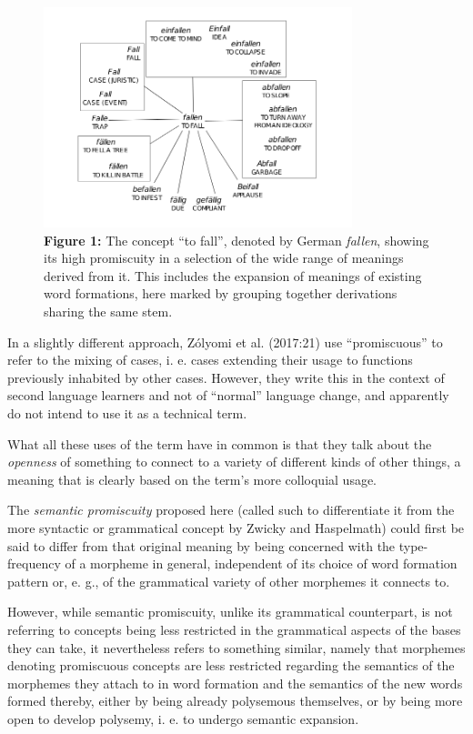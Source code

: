 \documentclass[
  a4paper,
  14pt,
  oneside,
  tablecaptionabove
]{scrbook}
\begin{document}
\begin{figure}[htb]
\centering
\includegraphics[width=0.8\textwidth]{images/fallen.png}
\captionsetup{justification=centering}
\caption*{\small \textbf{Figure 1:} The concept \enquote{to fall}, denoted by German
\emph{fallen}, showing its high promiscuity in a selection of the wide
range of meanings derived from it. This includes the expansion of
meanings of existing word formations, here marked by grouping together
derivations sharing the same stem. }
\end{figure}


In a slightly different approach, Zólyomi et al. (2017:21) use
\enquote{promiscuous} to refer to the mixing of cases, i. e. cases
extending their usage to functions previously inhabited by other cases.
However, they write this in the context of second language learners and
not of \enquote{normal} language change, and apparently do not intend to
use it as a technical term.

What all these uses of the term have in common is that they talk about
the \emph{openness} of something to connect to a variety of different
kinds of other things, a meaning that is clearly based on the term's
more colloquial usage.

The \emph{semantic promiscuity} proposed here (called such to
differentiate it from the more syntactic or grammatical concept by
Zwicky and Haspelmath) could first be said to differ from that original
meaning by being concerned with the type-frequency of a morpheme in
general, independent of its choice of word formation pattern or, e. g.,
of the grammatical variety of other morphemes it connects to.

However, while semantic promiscuity, unlike its grammatical counterpart,
is not referring to concepts being less restricted in the grammatical
aspects of the bases they can take, it nevertheless refers to something
similar, namely that morphemes denoting promiscuous concepts are less
restricted regarding the semantics of the morphemes they attach to in
word formation and the semantics of the new words formed thereby, either
by being already polysemous themselves, or by being more open to develop
polysemy, i. e. to undergo semantic expansion.
\end{document}
